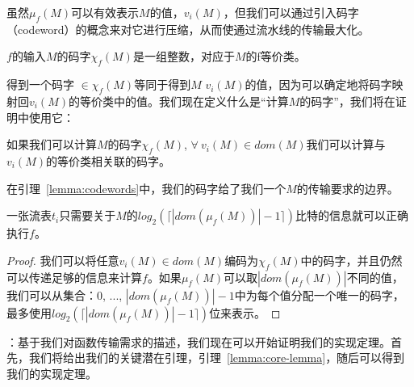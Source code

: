 
虽然$\mu_f(M)$可以有效表示$M$的值，$v_i(M)$，但我们可以通过引入码字（codeword）的概念来对它进行压缩，从而使通过流水线的传输最大化。

\begin{definition} $f$的输入$M$的码字$\chi_f(M)$是一组整数，对应于$M$的f等价类。
\end{definition}

得到一个码字 $\in \chi_f(M)$等同于得到$M$ $v_i(M)$的值，因为可以确定地将码字映射回$v_i(M)$的等价类中的值。我们现在定义什么是``计算$M$的码字''，我们将在证明中使用它：

\begin{definition} 如果我们可以计算$M$的码字$\chi_f(M)$, $\forall\ v_i(M) \in dom(M)$我们可以计算与$v_i(M)$的等价类相关联的码字。
\end{definition}

在引理~\ref{lemma:codewords}中，我们的码字给了我们一个$M$的传输要求的边界。

\begin{lemma} 
\label{lemma:codewords}
一张流表$t_i$只需要关于$M$的$log_2(\lceil |dom(\mu_f(M))|-1 \rceil)$比特的信息就可以正确执行$f$。
\end{lemma}

\begin{proof}
我们可以将任意$v_i(M) \in dom(M)$编码为$\chi_f(M)$中的码字，并且仍然可以传递足够的信息来计算$f$。如果$\mu_f(M)$可以取$|dom(\mu_f(M))|$不同的值，我们可以从集合：$0$, $...$, $|dom(\mu_f(M))|-1$中为每个值分配一个唯一的码字，最多使用$log_2(\lceil |dom(\mu_f(M))|-1 \rceil)$位来表示。
\end{proof}

：基于我们对函数传输需求的描述，我们现在可以开始证明我们的实现定理。首先，我们将给出我们的关键潜在引理，引理~\ref{lemma:core-lemma}，随后可以得到我们的实现定理。

